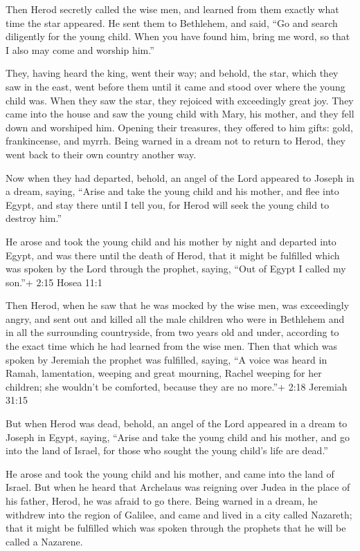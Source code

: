  Then Herod secretly called the wise men, and learned from
them exactly what time the star appeared.  He sent them to
Bethlehem, and said, ``Go and search diligently for the young child.
When you have found him, bring me word, so that I also may come and
worship him.''

 They, having heard the king, went their way; and behold,
the star, which they saw in the east, went before them until it came and
stood over where the young child was.  When they saw the
star, they rejoiced with exceedingly great joy.  They came
into the house and saw the young child with Mary, his mother, and they
fell down and worshiped him. Opening their treasures, they offered to
him gifts: gold, frankincense, and myrrh.  Being warned in
a dream not to return to Herod, they went back to their own country
another way.

 Now when they had departed, behold, an angel of the Lord
appeared to Joseph in a dream, saying, ``Arise and take the young child
and his mother, and flee into Egypt, and stay there until I tell you,
for Herod will seek the young child to destroy him.''

 He arose and took the young child and his mother by night
and departed into Egypt,  and was there until the death of
Herod, that it might be fulfilled which was spoken by the Lord through
the prophet, saying, ``Out of Egypt I called my son.''+ 2:15 Hosea 11:1

 Then Herod, when he saw that he was mocked by the wise
men, was exceedingly angry, and sent out and killed all the male
children who were in Bethlehem and in all the surrounding countryside,
from two years old and under, according to the exact time which he had
learned from the wise men.  Then that which was spoken by
Jeremiah the prophet was fulfilled, saying,  ``A voice was
heard in Ramah, lamentation, weeping and great mourning, Rachel weeping
for her children; she wouldn't be comforted, because they are no
more.''+ 2:18 Jeremiah 31:15

 But when Herod was dead, behold, an angel of the Lord
appeared in a dream to Joseph in Egypt, saying,  ``Arise
and take the young child and his mother, and go into the land of Israel,
for those who sought the young child's life are dead.''

 He arose and took the young child and his mother, and came
into the land of Israel.  But when he heard that Archelaus
was reigning over Judea in the place of his father, Herod, he was afraid
to go there. Being warned in a dream, he withdrew into the region of
Galilee,  and came and lived in a city called Nazareth;
that it might be fulfilled which was spoken through the prophets that he
will be called a Nazarene.

